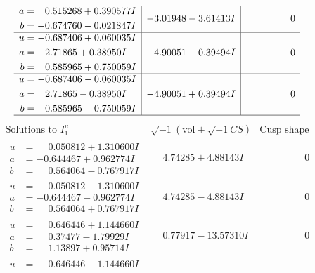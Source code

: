 \documentclass[1p]{elsarticle_modified}
\theoremstyle{definition}
\newcommand{\I}{\sqrt{-1}}
\begin{document}
$$\begin{array}{c|c|c}
\begin{aligned}
a &= \phantom{-}0.515268 + 0.390577 I \\
b &= -0.674760 - 0.021847 I\end{aligned}
 & -3.01948 - 3.61413 I & \phantom{-0.000000 } 0 \\ \hline\begin{aligned}
u &= -0.687406 + 0.060035 I \\
a &= \phantom{-}2.71865 + 0.38950 I \\
b &= \phantom{-}0.585965 + 0.750059 I\end{aligned}
 & -4.90051 - 0.39494 I & \phantom{-0.000000 } 0 \\ \hline\begin{aligned}
u &= -0.687406 - 0.060035 I \\
a &= \phantom{-}2.71865 - 0.38950 I \\
b &= \phantom{-}0.585965 - 0.750059 I\end{aligned}
 & -4.90051 + 0.39494 I & \phantom{-0.000000 } 0\\
 \hline 
 \end{array}$$\newpage$$\begin{array}{c|c|c}  
\text{Solutions to }I^u_{1}& \I (\text{vol} + \sqrt{-1}CS) & \text{Cusp shape}\\
 \hline 
\begin{aligned}
u &= \phantom{-}0.050812 + 1.310600 I \\
a &= -0.644467 + 0.962774 I \\
b &= \phantom{-}0.564064 - 0.767917 I\end{aligned}
 & \phantom{-}4.74285 + 4.88143 I & \phantom{-0.000000 } 0 \\ \hline\begin{aligned}
u &= \phantom{-}0.050812 - 1.310600 I \\
a &= -0.644467 - 0.962774 I \\
b &= \phantom{-}0.564064 + 0.767917 I\end{aligned}
 & \phantom{-}4.74285 - 4.88143 I & \phantom{-0.000000 } 0 \\ \hline\begin{aligned}
u &= \phantom{-}0.646446 + 1.144660 I \\
a &= \phantom{-}0.37477 - 1.79929 I \\
b &= \phantom{-}1.13897 + 0.95714 I\end{aligned}
 & \phantom{-}0.77917 - 13.57310 I & \phantom{-0.000000 } 0 \\ \hline\begin{aligned}
u &= \phantom{-}0.646446 - 1.144660 I \\

\end{aligned}
\end{array}$$
\end{document}
